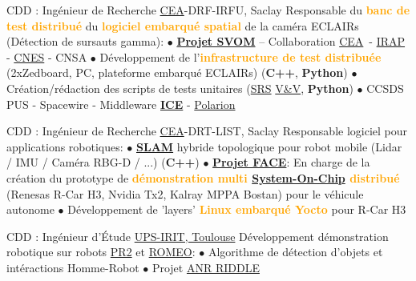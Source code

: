 \documentclass[
	a4paper,
	subsectioncolor=cvblue!70,
]{fortysecondscv}
\newcommand{\cea}{\href{http://www.cea.fr/}{CEA}}
\newcommand{\hl}[1]{\textbf{\textcolor{orange}{#1}}}
\begin{document}
\begin{cvtable}[2]
  {CDD : Ingénieur de Recherche}
  {\cea-DRF-IRFU, Saclay}
  {
    Responsable du \hl{banc de test distribué} du \hl{logiciel embarqué spatial} de la
    caméra ECLAIRs (Détection de sursauts gamma):\newline
    $\bullet$ \hl{\href{http://www.svom.fr/}{Projet SVOM}} -- Collaboration
    \cea\ - \href{http://www.irap.omp.eu/}{IRAP} -
    \href{https://cnes.fr/fr}{CNES} - CNSA\newline
    $\bullet$ Développement de l'\hl{infrastructure de test distribuée} (2xZedboard, PC, plateforme embarqué ECLAIRs) (\textbf{C++},
    \textbf{Python})\newline
    $\bullet$ Création/rédaction des scripts de tests unitaires
    (\href{https://en.wikipedia.org/wiki/Software_requirements_specification}{SRS}
    \href{https://en.wikipedia.org/wiki/Software_verification_and_validation}{V\&V},
    \textbf{Python})\newline
    $\bullet$ CCSDS PUS - Spacewire - Middleware
    \href{https://zeroc.com/products/ice}{\textbf{ICE}} -
    \href{https://www.plm.automation.siemens.com/global/en/products/polarion/}{Polarion}
  }

  {CDD : Ingénieur de Recherche}
  {\cea-DRT-LIST, Saclay}
  {
    Responsable logiciel pour applications robotiques:\newline
    $\bullet$
    \hl{\href{https://en.wikipedia.org/wiki/Simultaneous_localization_and_mapping}{SLAM}}
    hybride topologique pour robot mobile (Lidar / IMU / Caméra RBG-D / ...)
    (\textbf{C++})\newline
    $\bullet$ \textbf{\href{https://www.designspot.fr/portfolio/face/}{Projet
        FACE}}: En charge de la création du prototype de \hl{démonstration multi
    \href{https://en.wikipedia.org/wiki/System_on_a_chip}{System-On-Chip}
    distribué} (Renesas R-Car H3, Nvidia Tx2, Kalray MPPA Bostan) pour le
    véhicule autonome\newline
    $\bullet$ Développement de 'layers' \hl{Linux embarqué Yocto} pour R-Car H3
  }

  {CDD : Ingénieur d'Étude}
  {\href{https://www.irit.fr/?lang=fr}{UPS-IRIT, Toulouse}}
  {
    Développement démonstration robotique sur robots
    \href{http://www.willowgarage.com/pages/pr2/overview}{PR2} et
      \href{https://spectrum.ieee.org/automaton/robotics/humanoids/aldebaran-robotics-introduces-romeo-finally}{ROMEO}:\newline
    $\bullet$ Algorithme de détection d'objets et intéractions Homme-Robot\newline
    $\bullet$ Projet
    \href{http://www.agence-nationale-recherche.fr/Project-ANR-12-CORD-0003}{ANR
      RIDDLE}
  }
\end{cvtable}
\end{document}
